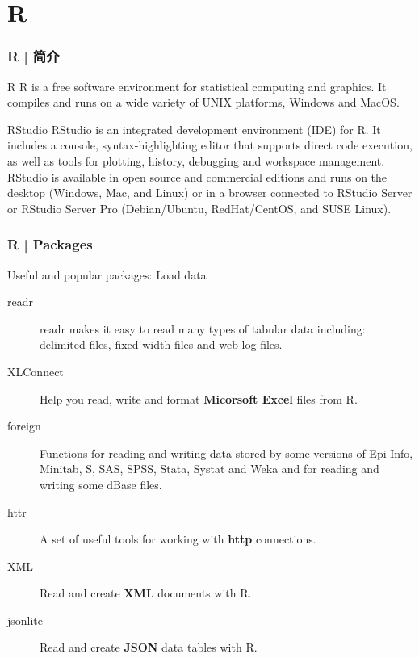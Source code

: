 \section{R}
\begin{frame}
  \frametitle{R | 简介}
  \begin{block}{R}
 R is a free software environment for statistical computing and graphics. It compiles and runs on a wide variety of UNIX platforms, Windows and MacOS.
  \end{block}
  \pause
  \begin{block}{\alert{RStudio}}
 RStudio is an integrated development environment (IDE) for R. It includes a console, syntax-highlighting editor that supports direct code execution, as well as tools for plotting, history, debugging and workspace management.\\
 \vspace{0.5em}
 RStudio is available in open source and commercial editions and runs on the desktop (Windows, Mac, and Linux) or in a browser connected to RStudio Server or RStudio Server Pro (Debian/Ubuntu, RedHat/CentOS, and SUSE Linux).
  \end{block}
\end{frame}

\begin{frame}
  \frametitle{R | Packages}
  \begin{block}{Useful and popular packages: Load data}
    \begin{description}
      \item[\alert{readr}] readr makes it easy to read many types of \alert{tabular data} including: delimited files, fixed width files and web log files.
      \item[XLConnect] Help you read, write and format \textbf{Micorsoft Excel} files from R.
      \item[foreign] Functions for reading and writing data stored by some versions of Epi Info, Minitab, S, SAS, SPSS, Stata, Systat and Weka and for reading and writing some dBase files.
      \item[httr] A set of useful tools for working with \textbf{http} connections.
      \item[XML] Read and create \textbf{XML} documents with R.
      \item[jsonlite] Read and create \textbf{JSON} data tables with R.
    \end{description}
  \end{block}
\end{frame}

